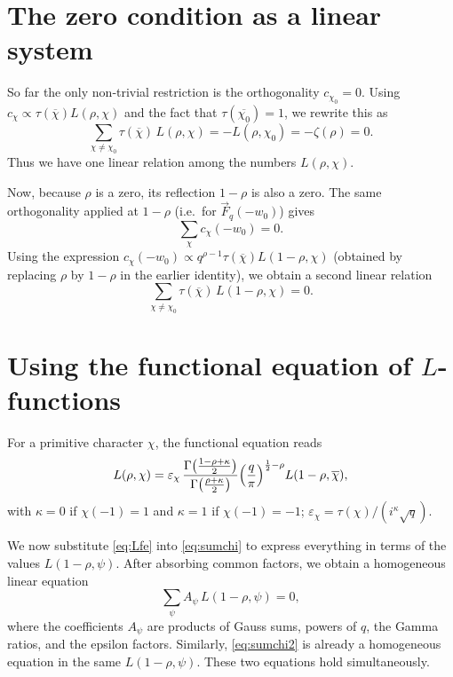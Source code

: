 \documentclass[12pt,a4paper]{article}
\theoremstyle{definition}
\begin{document}
\section{The zero condition as a linear system}
So far the only non‑trivial restriction is the orthogonality \(c_{\chi_0}=0\).  Using \(c_\chi\propto \tau(\overline{\chi})L(\rho,\chi)\) and the fact that \(\tau(\overline{\chi_0})=1\), we rewrite this as
\begin{equation}\label{eq:sumchi}
\sum_{\chi\neq\chi_0} \tau(\overline{\chi})\,L(\rho,\chi) = -L(\rho,\chi_0)= -\zeta(\rho)=0.
\end{equation}
Thus we have one linear relation among the numbers \(L(\rho,\chi)\).

Now, because \(\rho\) is a zero, its reflection \(1-\rho\) is also a zero.  The same orthogonality applied at \(1-\rho\) (i.e.\ for \(\vec{F}_q(-w_0)\)) gives
\[
\sum_{\chi} c_\chi(-w_0)=0.
\]
Using the expression \(c_\chi(-w_0)\propto q^{\rho-1}\tau(\overline{\chi})L(1-\rho,\chi)\) (obtained by replacing \(\rho\) by \(1-\rho\) in the earlier identity), we obtain a second linear relation
\begin{equation}\label{eq:sumchi2}
\sum_{\chi\neq\chi_0} \tau(\overline{\chi})\,L(1-\rho,\chi) = 0.
\end{equation}

\section{Using the functional equation of \(L\)-functions}
For a primitive character \(\chi\), the functional equation reads
\begin{equation}\label{eq:Lfe}
L(\rho,\chi) = \varepsilon_\chi\,
\frac{\Gamma\bigl(\frac{1-\rho+\kappa}{2}\bigr)}{\Gamma\bigl(\frac{\rho+\kappa}{2}\bigr)}
\Bigl(\frac{q}{\pi}\Bigr)^{\frac12-\rho} L(1-\rho,\overline{\chi}),
\end{equation}
with \(\kappa = 0\) if \(\chi(-1)=1\) and \(\kappa=1\) if \(\chi(-1)=-1\); \(\varepsilon_\chi = \tau(\chi)/(i^\kappa\sqrt{q})\).

We now substitute \eqref{eq:Lfe} into \eqref{eq:sumchi} to express everything in terms of the values \(L(1-\rho,\psi)\).  After absorbing common factors, we obtain a homogeneous linear equation
\begin{equation}\label{eq:lin1}
\sum_{\psi} A_\psi \, L(1-\rho,\psi) = 0,
\end{equation}
where the coefficients \(A_\psi\) are products of Gauss sums, powers of \(q\), the Gamma ratios, and the epsilon factors.  Similarly, \eqref{eq:sumchi2} is already a homogeneous equation in the same \(L(1-\rho,\psi)\).  These two equations hold simultaneously.
\end{document}
